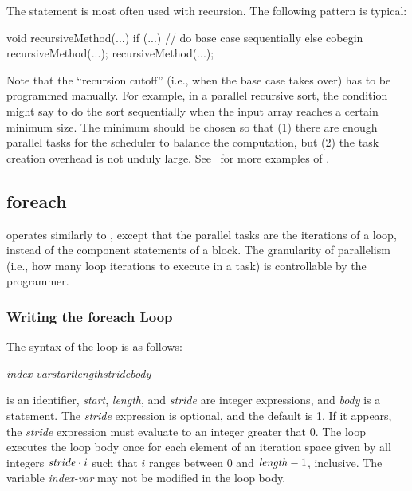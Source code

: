The  statement is most often used with recursion.  The
following pattern is typical:
%
\begin{dpjlisting}
void recursiveMethod(...) {
  if (...) {
    // do base case sequentially
  } else {
    cobegin {
      recursiveMethod(...);
      recursiveMethod(...);
    }
  }
}
\end{dpjlisting}
%
Note that the ``recursion cutoff'' (i.e., when the base case takes
over) has to be programmed manually.  For example, in a parallel
recursive sort, the condition might say to do the sort sequentially
when the input array reaches a certain minimum size.  The minimum
should be chosen so that (1) there are enough parallel tasks for the
scheduler to balance the computation, but (2) the task creation
overhead is not unduly large.  See \tutorial\ for more
examples of .

\subsection{foreach%
\label{sec:parallel:foreach}}

 operates similarly to , except that the
parallel tasks are the iterations of a loop, instead of the component
statements of a block.  The granularity of parallelism (i.e., how many
loop iterations to execute in a task) is controllable by the
programmer.

\subsubsection{Writing the foreach Loop%
\label{sec:parallel:foreach:writing}}

The syntax of the  loop is as follows:
%
\begin{description}
\item {}\emph{index-var}\emph{start}\kwd{, }\emph{length}\kwd{,
    }\emph{stride}\kwd{) }\emph{body}\kwd{;}
\end{description}
%
 is an identifier, \emph{start}, \emph{length}, and
\emph{stride} are integer expressions, and \emph{body} is a statement.
The \emph{stride} expression is optional, and the default is 1. If it
appears, the \emph{stride} expression must evaluate to an integer
greater that 0.  The  loop executes the loop body once
for each element of an iteration space given by all integers
$\mbox{\textit{stride}} \cdot i$ such that $i$ ranges between $0$ and
$\mbox{\textit{length}}-1$, inclusive.  The variable \emph{index-var} may
not be modified in the loop body.

